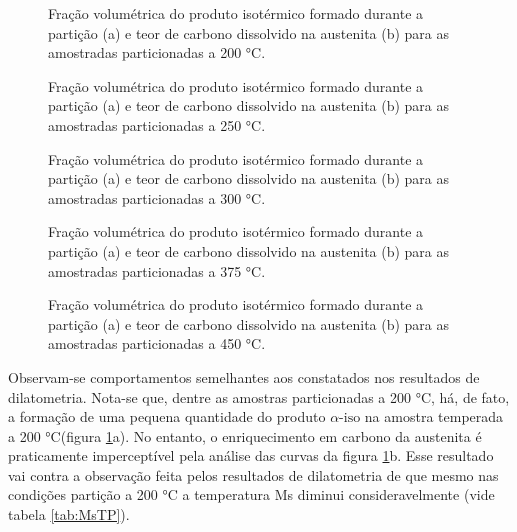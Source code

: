 \begin{figure}
	\quad
	\caption{Fração volumétrica do produto isotérmico formado durante a partição (a) e teor de carbono dissolvido na austenita (b) para as amostradas particionadas a 200 °C.}
	\label{fig:XTMSPT200}
\end{figure}

\begin{figure}
	\quad
	\caption{Fração volumétrica do produto isotérmico formado durante a partição (a) e teor de carbono dissolvido na austenita (b) para as amostradas particionadas a 250 °C.}
	\label{fig:XTMSPT250}
\end{figure}

\begin{figure}
	\quad
	\caption{Fração volumétrica do produto isotérmico formado durante a partição (a) e teor de carbono dissolvido na austenita (b) para as amostradas particionadas a 300 °C.}
	\label{fig:XTMSPT300}
\end{figure}

\begin{figure}
	\quad
	\caption{Fração volumétrica do produto isotérmico formado durante a partição (a) e teor de carbono dissolvido na austenita (b) para as amostradas particionadas a 375 °C.}
	\label{fig:XTMSPT375}
\end{figure}

\begin{figure}
	\quad
	\caption{Fração volumétrica do produto isotérmico formado durante a partição (a) e teor de carbono dissolvido na austenita (b) para as amostradas particionadas a 450 °C.}
	\label{fig:XTMSPT450}
\end{figure}

Observam-se comportamentos semelhantes aos constatados nos resultados de dilatometria. Nota-se que, dentre as amostras particionadas a 200 °C, há, de fato, a formação de uma pequena quantidade do produto $\alpha\text{-iso}$ na amostra temperada a 200 °C(figura \ref{fig:XTMSPT200}a). No entanto, o enriquecimento em carbono da austenita é praticamente imperceptível pela análise das curvas da figura \ref{fig:XTMSPT200}b. Esse resultado vai contra a observação feita pelos resultados de dilatometria de que mesmo nas condições partição a 200 °C a temperatura Ms diminui consideravelmente (vide tabela \ref{tab:MsTP}).

